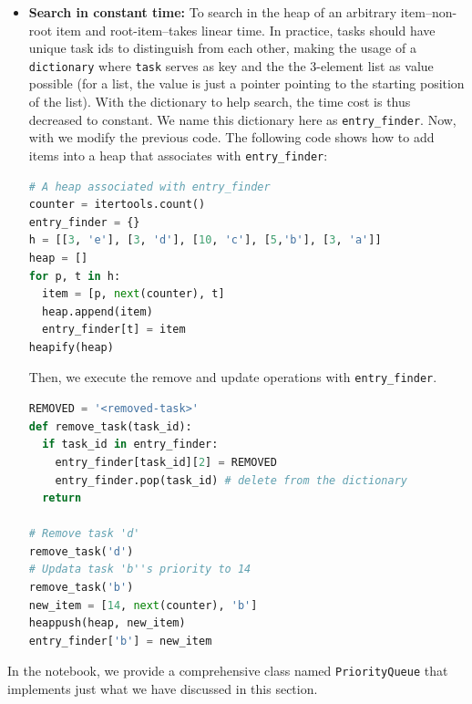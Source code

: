 \documentclass[../main.tex]{subfiles}
\begin{document}
\begin{itemize}
Let's use the same example here. We first remove task `d' and then update task `b''s priority to 14. Then we use another list \texttt{vh} to get the relative ordering of tasks in the heap according to the priority.
\begin{lstlisting}[language=Python]
REMOVED = '<removed-task>'
# Remove task 'd'
h[1][2] = REMOVED
# Updata task 'b''s proprity to 14
h[3][2] = REMOVED
heappush(h, [14, next(counter), 'b'])
vh = []
while h:
  item = heappop(h)
  if item[2] != REMOVED:
    vh.append(item)
\end{lstlisting}
The printout for \texttt{vh} is:
\begin{lstlisting}[language=Python]
[[3, 0, 'e'], [3, 4, 'a'], [10, 2, 'c'], [14, 5, 'b']]
\end{lstlisting}

\item \textbf{Search in constant time:} To search in the heap of an arbitrary item--non-root item and root-item--takes linear time. In practice, tasks should have unique task ids to distinguish from each other, making the usage of a  \texttt{dictionary} where \texttt{task} serves as key and the the 3-element list as value possible (for a list, the value is just a pointer pointing to the starting position of the list). With the dictionary to help search, the time cost is thus decreased to constant. We name this dictionary here as \texttt{entry\_finder}. Now, with we modify the previous code. The following code shows how  to add items into a heap that associates with \texttt{entry\_finder}:
\begin{lstlisting}[language=Python]
# A heap associated with entry_finder
counter = itertools.count()
entry_finder = {}
h = [[3, 'e'], [3, 'd'], [10, 'c'], [5,'b'], [3, 'a']]
heap = []
for p, t in h:
  item = [p, next(counter), t]
  heap.append(item)
  entry_finder[t] = item
heapify(heap)
\end{lstlisting}
Then, we execute the remove and update operations with \texttt{entry\_finder}. 
\begin{lstlisting}[language=Python]
REMOVED = '<removed-task>'
def remove_task(task_id):
  if task_id in entry_finder:
    entry_finder[task_id][2] = REMOVED
    entry_finder.pop(task_id) # delete from the dictionary
  return

# Remove task 'd'
remove_task('d')
# Updata task 'b''s priority to 14
remove_task('b')
new_item = [14, next(counter), 'b']
heappush(heap, new_item)
entry_finder['b'] = new_item
\end{lstlisting}
\end{itemize}
In the notebook, we provide a comprehensive class named \texttt{PriorityQueue} that implements just what we have discussed in this section.
\end{document}
